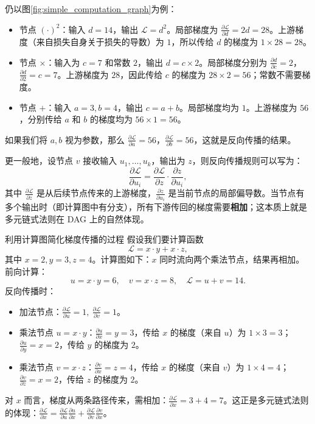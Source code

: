 仍以图\cref{fig:simple_computation_graph}为例：
\begin{itemize}
    \item 节点 $(\cdot)^2$：输入 $d=14$，输出 $\mathcal{L} = d^2$。局部梯度为 $\frac{\partial \mathcal{L}}{\partial d} = 2d = 28$。上游梯度（来自损失自身关于损失的导数）为 $1$，所以传给 $d$ 的梯度为 $1 \times 28 = 28$。
    \item 节点 $\times$：输入为 $c=7$ 和常数 $2$，输出 $d = c \times 2$。局部梯度分别为 $\frac{\partial d}{\partial c}=2$，$\frac{\partial d}{\partial 2}=c=7$。上游梯度为 $28$，因此传给 $c$ 的梯度为 $28 \times 2 = 56$；常数不需要梯度。
    \item 节点 $+$：输入 $a=3,b=4$，输出 $c=a+b$。局部梯度均为 $1$。上游梯度为 $56$，分别传给 $a$ 和 $b$ 的梯度均为 $56\times 1=56$。
\end{itemize}
如果我们将 $a,b$ 视为参数，那么 $\frac{\partial \mathcal{L}}{\partial a}=56$，$\frac{\partial \mathcal{L}}{\partial b}=56$，这就是反向传播的结果。

更一般地，设节点 $v$ 接收输入 $u_1,\dots,u_k$，输出为 $z$，则反向传播规则可以写为：
\[
    \frac{\partial \mathcal{L}}{\partial u_i} = \frac{\partial \mathcal{L}}{\partial z} \cdot \frac{\partial z}{\partial u_i},
\]
其中 $\frac{\partial \mathcal{L}}{\partial z}$ 是从后续节点传来的上游梯度，$\frac{\partial z}{\partial u_i}$ 是当前节点的局部偏导数。当节点有多个输出时（即计算图中有分支），所有下游传回的梯度需要\textbf{相加}；这本质上就是多元链式法则在 DAG 上的自然体现。

\begin{example}{利用计算图简化梯度传播的过程}{}
    假设我们要计算函数
    \[
        \mathcal{L} = x \cdot y + x \cdot z,
    \]
    其中 $x=2, y=3, z=4$。计算图如下：$x$ 同时流向两个乘法节点，结果再相加。前向计算：
    \[
        u = x \cdot y = 6,\quad v = x \cdot z = 8,\quad \mathcal{L} = u + v = 14.
    \]
    反向传播时：
    \begin{itemize}
        \item 加法节点：$\frac{\partial \mathcal{L}}{\partial u}=1,\ \frac{\partial \mathcal{L}}{\partial v}=1$。
        \item 乘法节点 $u=x\cdot y$：$\frac{\partial u}{\partial x}=y=3$，传给 $x$ 的梯度（来自 $u$）为 $1\times 3=3$；$\frac{\partial u}{\partial y}=x=2$，传给 $y$ 的梯度为 $2$。
        \item 乘法节点 $v=x\cdot z$：$\frac{\partial v}{\partial x}=z=4$，传给 $x$ 的梯度（来自 $v$）为 $1\times 4=4$；$\frac{\partial v}{\partial z}=x=2$，传给 $z$ 的梯度为 $2$。
    \end{itemize}
    对 $x$ 而言，梯度从两条路径传来，需相加：$\frac{\partial \mathcal{L}}{\partial x} = 3 + 4 = 7$。这正是多元链式法则的体现：$\frac{\partial \mathcal{L}}{\partial x} = \frac{\partial \mathcal{L}}{\partial u}\frac{\partial u}{\partial x} + \frac{\partial \mathcal{L}}{\partial v}\frac{\partial v}{\partial x}$。
\end{example}

